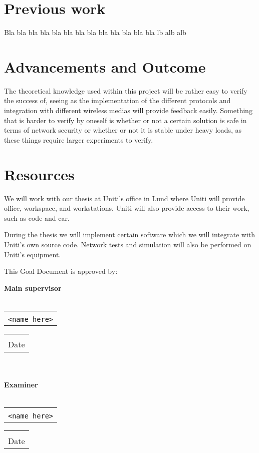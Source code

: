 \documentclass[a4paper]{article}
\makeatletter
\newcommand{\signature}[2]{%
	\noindent%
	\textbf{{#1}}\\\\
	\begin{tabular}{@{}p{2.5in}@{}}
		\\ \hline \\[-.75\normalbaselineskip]
		\texttt{{#2}}
	\end{tabular} \hspace{0in}
	\begin{tabular}{@{}p{2.5in}@{}}
		\\ \hline \\[-.75\normalbaselineskip]
		Date
	\end{tabular}\\
}
\makeatother
\begin{document}
\section{Previous work}
Bla bla bla bla bla bla bla bla bla bla bla bla bla lb alb alb 


\section{Advancements and Outcome}
The theoretical knowledge used within this project will be rather easy
to verify the success of, seeing as the implementation of the different 
protocols and integration with different wireless medias will provide
feedback easily. Something that is harder to verify by oneself is whether
or not a certain solution is safe in terms of network security or whether
or not it is stable under heavy loads, as these things require larger
experiments to verify.

\section{Resources}
We will work with our thesis at Uniti's office in Lund where Uniti will provide
office, workspace, and workstations. Uniti will also provide access to their
work, such as code and car. 

During the thesis we will implement certain software which we will integrate
with Uniti's own source code. Network tests and simulation will also be
performed on Uniti's equipment.


{}



This Goal Document is approved by:

\signature{Main supervisor}{<name here>}\\

\signature{Examiner}{<name here>}
\end{document}
